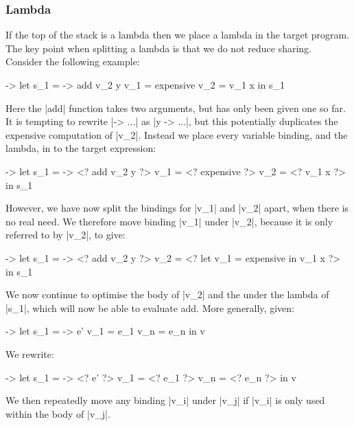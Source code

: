\documentclass[draft]{sigplanconf}
\begin{document}
\subsubsection{Lambda}
\label{sec:eval_split_lambda}

If the top of the stack is a lambda then we place a lambda in the target program. The key point when splitting a lambda is that we do not reduce sharing. Consider the following example:

\begin{code}
\x ->  let  s_1 = \y -> add v_2 y
            v_1 = expensive
            v_2 = v_1 x
       in   s_1
\end{code}

Here the |add| function takes two arguments, but has only been given one so far. It is tempting to rewrite |\x -> ...| as |\x y -> ...|, but this potentially duplicates the expensive computation of |v_2|. Instead we place every variable binding, and the lambda, in to the target expression:

\begin{code}
\x ->  let  s_1 = \y -> <? add v_2 y ?>
            v_1 = <? expensive ?>
            v_2 = <? v_1 x ?>
       in   s_1
\end{code}

However, we have now split the bindings for |v_1| and |v_2| apart, when there is no real need. We therefore move binding |v_1| under |v_2|, because it is only referred to by |v_2|, to give:

\begin{code}
\x ->  let  s_1 = \y -> <? add v_2 y ?>
            v_2 = <? let v_1 = expensive in v_1 x ?>
       in   s_1
\end{code}

We now continue to optimise the body of |v_2| and the under the lambda of |s_1|, which will now be able to evaluate add. More generally, given:

\begin{code}
\free ->  let  s_1  = \x -> e'
               v_1  = e_1
               v_n  = e_n
          in   v
\end{code}

We rewrite:

\begin{code}
\free ->  let  s_1  = \x -> <? e' ?>
               v_1  = <? e_1 ?>
               v_n  = <? e_n ?>
          in   v
\end{code}

We then repeatedly move any binding |v_i| under |v_j| if |v_i| is only used within the body of |v_j|.
\end{document}
